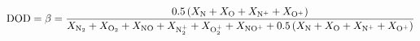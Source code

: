 \documentclass[10pt]{article}
\begin{document}
\begin{align*}{\rm DOD} = \beta = 
\frac{
0.5\left( X_{\rm N}+X_{\rm O}+X_{\rm N^+}+X_{\rm O^+}\right)
}
{
X_{\rm N_2}+X_{\rm O_2} + X_{\rm NO} + X_{\rm N_2^+}+X_{\rm O_2^+}+X_{\rm NO^+} + 0.5\left( X_{\rm N}+X_{\rm O}+X_{\rm N^+}+X_{\rm O^+}\right)
}\end{align*}
\end{document}

